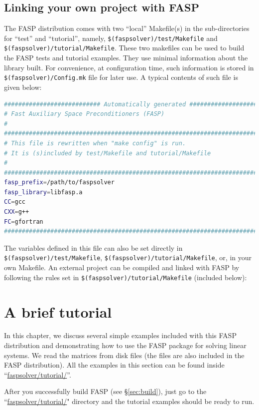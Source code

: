 \documentclass[11pt]{memoir}
\begin{document}
\section{Linking your own project with FASP}\label{sec:buildown}
The FASP distribution comes with two ``local'' Makefile(s) in the
sub-directories for ``test'' and ``tutorial'', namely,
\verb|$(faspsolver)/test/Makefile| and
\verb|$(faspsolver)/tutorial/Makefile|.
These two makefiles can be used to build the FASP tests and tutorial
examples. They use minimal information about the library built. For
convenience, at configuration time, such information is stored in
\verb|$(faspsolver)/Config.mk| file for later use. A typical contents
of such file is given below:
\begin{lstlisting}[language=sh,numbers=none]
########################### Automatically generated ###################
# Fast Auxiliary Space Preconditioners (FASP) 
#
#######################################################################
# This file is rewritten when "make config" is run.
# It is (s)included by test/Makefile and tutorial/Makefile
#
#######################################################################
fasp_prefix=/path/to/faspsolver
fasp_library=libfasp.a
CC=gcc
CXX=g++
FC=gfortran
#######################################################################
\end{lstlisting}
The variables defined in this file can also be set directly in
\verb|$(faspsolver)/test/Makefile|,
\verb|$(faspsolver)/tutorial/Makefile|, or, in your own Makefile. An
external project can be compiled and linked with FASP by following the
rules set in \verb|$(faspsolver)/tutorial/Makefile| (included below):


\chapter{A brief tutorial}\label{ch:tutor}

In this chapter, we discuss several simple examples included with this
FASP distribution and demonstrating how to
use the FASP package for solving linear systems. We read the matrices
from disk files (the files are also included in the FASP
distribution). 
All the examples in this section can be found inside ``\url{faspsolver/tutorial/}''. 

After you successfully build FASP (see \S\ref{sec:build}), just go to the
``\url{faspsolver/tutorial/}" directory and the tutorial
examples should be ready to run.
\end{document}
